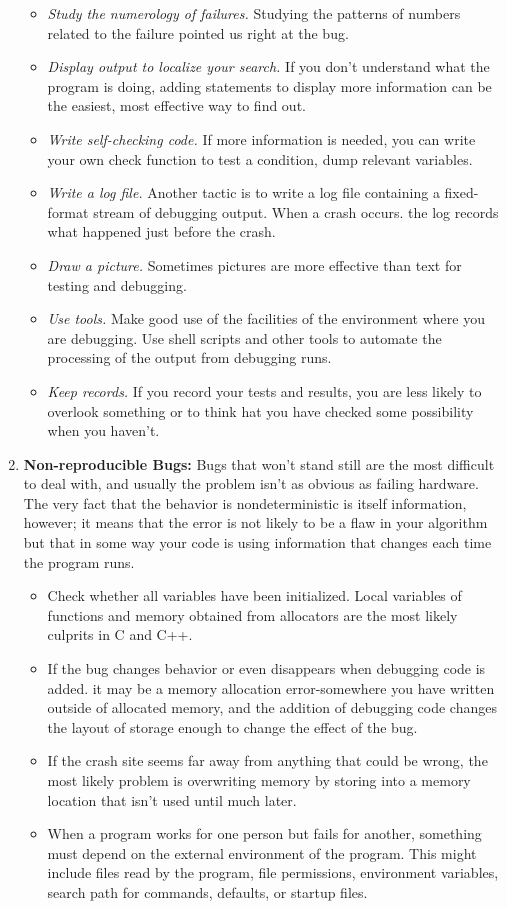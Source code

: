 \documentclass[draftclsnofoot,journal,onecolumn,12pt]{IEEEtran}
\begin{document}
\begin{enumerate}
\begin{itemize}
    \item \textit{Study the numerology of failures.} Studying the patterns of numbers related to the failure pointed us right at the bug.
    \item \textit{Display output to localize your search.} If you don't understand what the program is doing, adding statements to display more information can be the easiest, most effective way to find out.
    \item \textit{Write self-checking code.} If more information is needed, you can write your own check function to test a condition, dump relevant variables.
    \item \textit{Write a log file.} Another tactic is to write a log file containing a fixed-format stream of debugging output. When a crash occurs. the log records what happened just before the crash.
    \item \textit{Draw a picture.} Sometimes pictures are more effective than text for testing and debugging.
    \item \textit{Use tools.} Make good use of the facilities of the environment where you are debugging. Use shell scripts and other tools to automate the processing of the output from debugging runs.
    \item \textit{Keep records.} If you record your tests and results, you are less likely to overlook something or to think hat you have checked some possibility when you haven't.
    \end{itemize}
  \item \textbf{Non-reproducible Bugs:} Bugs that won't stand still are the most difficult to deal with, and usually the problem isn't as obvious as failing hardware. The very fact that the behavior is nondeterministic is itself information, however; it means that the error is not likely to be a flaw in your algorithm but that in some way your code is using information that changes each time the program runs.
      \begin{itemize}
        \item Check whether all variables have been initialized. Local variables of functions and memory obtained from allocators are the most likely culprits in C and C++.
        \item If the bug changes behavior or even disappears when debugging code is added. it may be a memory allocation error-somewhere you have written outside of allocated memory, and the addition of debugging code changes the layout of storage enough to change the effect of the bug.
        \item If the crash site seems far away from anything that could be wrong, the most likely problem is overwriting memory by storing into a memory location that isn't used until much later.
        \item When a program works for one person but fails for another, something must depend on the external environment of the program. This might include files read by the program, file permissions, environment variables, search path for commands, defaults, or startup files.
      \end{itemize}
\end{enumerate}
\end{document}
